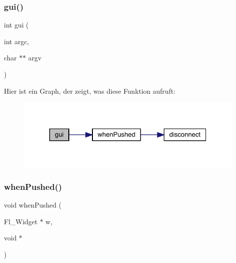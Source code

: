 \subsubsection{gui()}
{\footnotesize\ttfamily int gui (\begin{DoxyParamCaption}\item[{int}]{argc,  }\item[{char $\ast$$\ast$}]{argv }\end{DoxyParamCaption})}

Hier ist ein Graph, der zeigt, was diese Funktion aufruft\+:\nopagebreak
\begin{figure}[H]
\begin{center}
\leavevmode
\includegraphics[width=319pt]{gui_8cpp_ace0698412b74cdbc0571809a0d903b49_cgraph}
\end{center}
\end{figure}
\mbox{\label{gui_8cpp_aa0976691d9932853389991b8459ebd85}} 
\subsubsection{when\+Pushed()}
{\footnotesize\ttfamily void when\+Pushed (\begin{DoxyParamCaption}\item[{Fl\+\_\+\+Widget $\ast$}]{w,  }\item[{void $\ast$}]{ }\end{DoxyParamCaption})}

